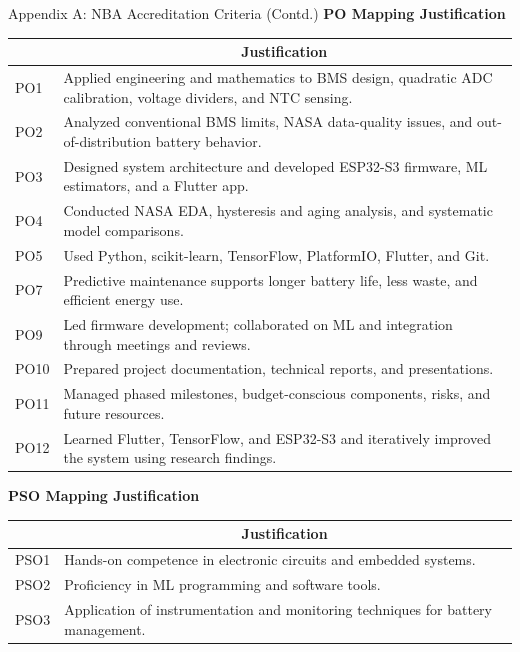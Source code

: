 \documentclass[10pt,aspectratio=43]{beamer}
\begin{document}
\begin{frame}{Appendix A: NBA Accreditation Criteria (Contd.)}
  \scriptsize
  \centering
  \renewcommand{\arraystretch}{1.0}
  \setlength{\tabcolsep}{2pt}
  \textbf{PO Mapping Justification}\par
  \vspace{2pt}
  \begin{tabularx}{0.96\textwidth}{|p{}|X|}
    \hline
    \rowcolor{mappingheader}\multicolumn{1}{|c|}{\textbf{PO}} & \multicolumn{1}{c|}{\textbf{Justification}} \\ \hline
    PO1 & Applied engineering and mathematics to BMS design, quadratic ADC calibration, voltage dividers, and NTC sensing. \\ \hline
    PO2 & Analyzed conventional BMS limits, NASA data-quality issues, and out-of-distribution battery behavior. \\ \hline
    PO3 & Designed system architecture and developed ESP32-S3 firmware, ML estimators, and a Flutter app. \\ \hline
    PO4 & Conducted NASA EDA, hysteresis and aging analysis, and systematic model comparisons. \\ \hline
    PO5 & Used Python, scikit-learn, TensorFlow, PlatformIO, Flutter, and Git. \\ \hline
    PO7 & Predictive maintenance supports longer battery life, less waste, and efficient energy use. \\ \hline
    PO9 & Led firmware development; collaborated on ML and integration through meetings and reviews. \\ \hline
    PO10 & Prepared project documentation, technical reports, and presentations. \\ \hline
    PO11 & Managed phased milestones, budget-conscious components, risks, and future resources. \\ \hline
    PO12 & Learned Flutter, TensorFlow, and ESP32-S3 and iteratively improved the system using research findings. \\ \hline
  \end{tabularx}
  \par\vspace{4pt}
  \textbf{PSO Mapping Justification}\par
  \vspace{1pt}
  \begin{tabularx}{0.96\textwidth}{|p{}|X|}
    \hline
    \rowcolor{mappingheader}\multicolumn{1}{|c|}{\textbf{PSO}} & \multicolumn{1}{c|}{\textbf{Justification}} \\ \hline
    PSO1 & Hands-on competence in electronic circuits and embedded systems. \\ \hline
    PSO2 & Proficiency in ML programming and software tools. \\ \hline
    PSO3 & Application of instrumentation and monitoring techniques for battery management. \\ \hline
  \end{tabularx}
\end{frame}
\end{document}
